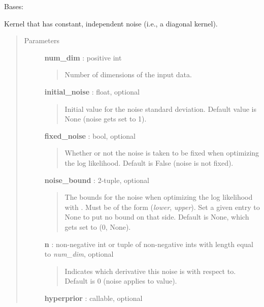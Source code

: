 \documentclass[letterpaper,10pt,english]{sphinxmanual}
\begin{document}
\begin{fulllineitems}
\label{gptools.kernel:gptools.kernel.noise.DiagonalNoiseKernel}
Bases: {\hyperref[gptools.kernel:gptools.kernel.core.Kernel]{}}

Kernel that has constant, independent noise (i.e., a diagonal kernel).
\begin{quote}\begin{description}
\item[{Parameters}] \leavevmode
\textbf{num\_dim} : positive int
\begin{quote}

Number of dimensions of the input data.
\end{quote}

\textbf{initial\_noise} : float, optional
\begin{quote}

Initial value for the noise standard deviation. Default value is None
(noise gets set to 1).
\end{quote}

\textbf{fixed\_noise} : bool, optional
\begin{quote}

Whether or not the noise is taken to be fixed when optimizing the log
likelihood. Default is False (noise is not fixed).
\end{quote}

\textbf{noise\_bound} : 2-tuple, optional
\begin{quote}

The bounds for the noise when optimizing the log likelihood with
. Must be of the form
(\emph{lower}, \emph{upper}). Set a given entry to None to put no bound on
that side. Default is None, which gets set to (0, None).
\end{quote}

\textbf{n} : non-negative int or tuple of non-negative ints with length equal to \emph{num\_dim}, optional
\begin{quote}

Indicates which derivative this noise is with respect to. Default is 0
(noise applies to value).
\end{quote}

\textbf{hyperprior} : callable, optional
\begin{quote}


\end{quote}
\end{description}
\end{quote}
\end{fulllineitems}
\end{document}
